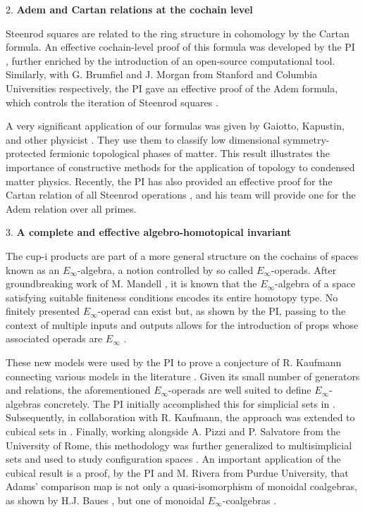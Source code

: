\documentclass{amsart}
\begin{document}
	2. \textbf{Adem and Cartan relations at the cochain level}

	Steenrod squares are related to the ring structure in cohomology by the Cartan formula. An effective cochain-level proof of this formula was developed by the PI \cite{medina2020cartan}, further enriched by the introduction of an open-source computational tool. Similarly, with G. Brumfiel and J. Morgan from Stanford and Columbia Universities respectively, the PI gave an effective proof of the Adem formula, which controls the iteration of Steenrod squares \cite{medina2021adem}.

	A very significant application of our formulas was given by Gaiotto, Kapustin, and other physicist \cite{kapustin2017fermionic, barkeshli2021classification}.
	They use them to classify low dimensional symmetry-protected fermionic topological phases of matter. This result illustrates the importance of constructive methods for the application of topology to condensed matter physics.
	Recently, the PI has also provided an effective proof for the Cartan relation of all Steenrod operations \cite{medina2023oddcartan}, and his team will provide one for the Adem relation over all primes.

	3. \textbf{A complete and effective algebro-homotopical invariant}

	The cup-i products are part of a more general structure on the cochains of spaces known as an $E_\infty$-algebra, a notion controlled by so called $E_\infty$-operads. After groundbreaking work of M. Mandell \cite{mandell2006homotopy_type}, it is known that the $E_\infty$-algebra of a space satisfying suitable finiteness conditions encodes its entire homotopy type. No finitely presented $E_\infty$-operad can exist but, as shown by the PI, passing to the context of multiple inputs and outputs allows for the introduction of props whose associated operads are $E_\infty$ \cite{medina2020prop1,medina2021prop2}.

	These new models were used by the PI to prove a conjecture of R. Kaufmann connecting various models in the literature \cite{kaufmann2009dimension}. Given its small number of generators and relations, the aforementioned $E_\infty$-operads are well suited to define $E_\infty$-algebras concretely. The PI initially accomplished this for simplicial sets in \cite{medina2020prop1}. Subsequently, in collaboration with R. Kaufmann, the approach was extended to cubical sets in \cite{medina2022cube_einfty}. Finally, working alongside A. Pizzi and P. Salvatore from the University of Rome, this methodology was further generalized to multisimplicial sets and used to study configuration spaces \cite{medina2022multisimplicial}. An important application of the cubical result is a proof, by the PI and M. Rivera from Purdue University, that Adams' comparison map is not only a quasi-isomorphism of monoidal coalgebras, as shown by H.J. Baues \cite{baues1998hopf}, but one of monoidal $E_\infty$-coalgebras \cite{medina2021cobar}.
\end{document}
